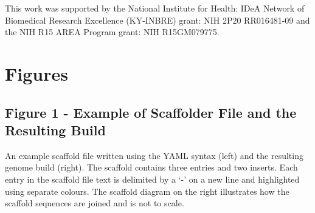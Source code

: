 \documentclass[10pt]{bmc_article}
\newenvironment{bmcformat}{\begin{raggedright}\baselineskip20pt\sloppy\setboolean{publ}{false}}{\end{raggedright}\baselineskip20pt\sloppy}
\begin{document}
\begin{bmcformat}
This work was supported by the National Institute for Health: IDeA Network of
Biomedical Research Excellence (KY-INBRE) grant: NIH 2P20 RR016481-09 and the
NIH R15 AREA Program grant: NIH R15GM079775.

\clearpage

{
   }     %


\clearpage

\section*{Figures} %

\subsection*{Figure 1 - Example of Scaffolder File and the Resulting Build}

An example scaffold file written using the YAML syntax \cite{yaml} (left) and
the resulting genome build (right). The scaffold contains three entries and two
inserts. Each entry in the scaffold file text is delimited by a `-' on a new
line and highlighted using separate colours. The scaffold diagram on the right
illustrates how the scaffold sequences are joined and is not to scale. \pb

\end{bmcformat}
\end{document}
